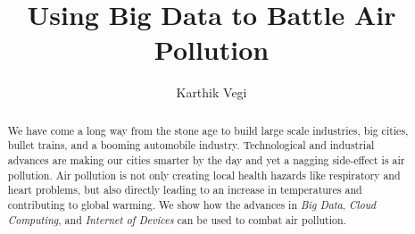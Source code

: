 \documentclass[sigconf]{acmart}
\begin{document}
\title{Using Big Data to Battle Air Pollution}

\author{Karthik Vegi}


\renewcommand{\shortauthors}{kvegi}

\begin{abstract}
We have come a long way from the stone age to build large scale industries, big cities, bullet trains, and a booming automobile industry. Technological and industrial advances are making our cities smarter by the day and yet a nagging side-effect is air pollution. Air pollution is not only creating local health hazards like respiratory and heart problems, but also directly leading to an increase in temperatures and contributing to global warming. We show how the advances in {\em Big Data}, {\em Cloud Computing}, and {\em Internet of Devices} can be used to combat air pollution.
\end{abstract}


\maketitle
\end{document}
